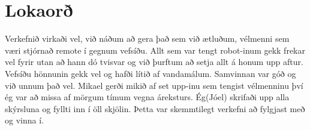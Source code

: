 \section{Lokaorð}
Verkefnið virkaði vel, við náðum að gera það sem við ætluðum, vélmenni sem væri stjórnað remote í gegnum vefsíðu. Allt sem var tengt robot-inum gekk frekar vel fyrir utan að hann dó tvisvar og við þurftum að setja allt á honum upp aftur. Vefsíðu hönnunin gekk vel og hafði lítið af vandamálum. Samvinnan var góð og við unnum það vel. Mikael gerði mikið af set upp-inu sem tengist vélmenninu því ég var að missa af mörgum tímum vegna áreksturs. Ég(Jóel) skrifaði upp alla skýrsluna og fyllti inn í öll skjölin. 
Þetta var skemmtilegt verkefni að fylgjast með og vinna í. 